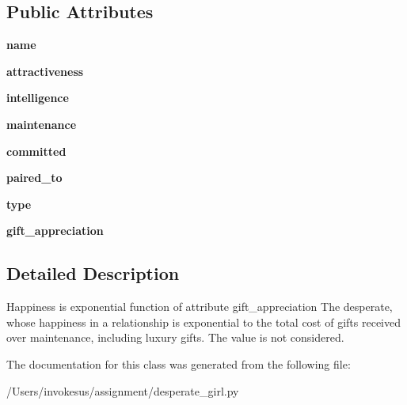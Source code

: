 \subsection*{Public Attributes}
\begin{DoxyCompactItemize}
\item 
\mbox{\label{classdesperate__girl_1_1_desperate___girl_a09f294c963c5b67278861e6ca00c7f6d}} 
{\bfseries name}
\item 
\mbox{\label{classdesperate__girl_1_1_desperate___girl_affeed709b0bdb8c8c7250fe7ee5c77b4}} 
{\bfseries attractiveness}
\item 
\mbox{\label{classdesperate__girl_1_1_desperate___girl_a7c861186b97d1e17d1290813baa836c2}} 
{\bfseries intelligence}
\item 
\mbox{\label{classdesperate__girl_1_1_desperate___girl_a0737a668754634c2706e6a01b442670e}} 
{\bfseries maintenance}
\item 
\mbox{\label{classdesperate__girl_1_1_desperate___girl_a3afc3b57cd5fdbbf47487772047c0f70}} 
{\bfseries committed}
\item 
\mbox{\label{classdesperate__girl_1_1_desperate___girl_ab94bc99816a300146110fd6cfb3823c3}} 
{\bfseries paired\+\_\+to}
\item 
\mbox{\label{classdesperate__girl_1_1_desperate___girl_a55e8038abc86bd1a207878a70dac24c7}} 
{\bfseries type}
\item 
\mbox{\label{classdesperate__girl_1_1_desperate___girl_ac177c9aef939da3b0830fccfda51eb51}} 
{\bfseries gift\+\_\+appreciation}
\end{DoxyCompactItemize}


\subsection{Detailed Description}
\begin{DoxyVerb}Happiness is exponential function of attribute gift_appreciation
The desperate, whose happiness in a relationship is exponential to the total cost of gifts received over maintenance, including luxury gifts. The value is not considered.
\end{DoxyVerb}
 

The documentation for this class was generated from the following file\+:\begin{DoxyCompactItemize}
\item 
/\+Users/invokesus/assignment/desperate\+\_\+girl.\+py\end{DoxyCompactItemize}
